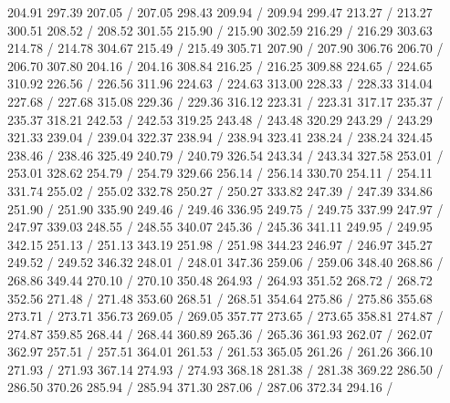{ 204.91 297.39 207.05 /
 207.05 298.43 209.94 /
 209.94 299.47 213.27 /
 213.27 300.51 208.52 /
 208.52 301.55 215.90 /
 215.90 302.59 216.29 /
 216.29 303.63 214.78 /
 214.78 304.67 215.49 /
 215.49 305.71 207.90 /
 207.90 306.76 206.70 /
 206.70 307.80 204.16 /
 204.16 308.84 216.25 /
 216.25 309.88 224.65 /
 224.65 310.92 226.56 /
 226.56 311.96 224.63 /
 224.63 313.00 228.33 /
 228.33 314.04 227.68 /
 227.68 315.08 229.36 /
 229.36 316.12 223.31 /
 223.31 317.17 235.37 /
 235.37 318.21 242.53 /
 242.53 319.25 243.48 /
 243.48 320.29 243.29 /
 243.29 321.33 239.04 /
 239.04 322.37 238.94 /
 238.94 323.41 238.24 /
 238.24 324.45 238.46 /
 238.46 325.49 240.79 /
 240.79 326.54 243.34 /
 243.34 327.58 253.01 /
 253.01 328.62 254.79 /
 254.79 329.66 256.14 /
 256.14 330.70 254.11 /
 254.11 331.74 255.02 /
 255.02 332.78 250.27 /
 250.27 333.82 247.39 /
 247.39 334.86 251.90 /
 251.90 335.90 249.46 /
 249.46 336.95 249.75 /
 249.75 337.99 247.97 /
 247.97 339.03 248.55 /
 248.55 340.07 245.36 /
 245.36 341.11 249.95 /
 249.95 342.15 251.13 /
 251.13 343.19 251.98 /
 251.98 344.23 246.97 /
 246.97 345.27 249.52 /
 249.52 346.32 248.01 /
 248.01 347.36 259.06 /
 259.06 348.40 268.86 /
 268.86 349.44 270.10 /
 270.10 350.48 264.93 /
 264.93 351.52 268.72 /
 268.72 352.56 271.48 /
 271.48 353.60 268.51 /
 268.51 354.64 275.86 /
 275.86 355.68 273.71 /
 273.71 356.73 269.05 /
 269.05 357.77 273.65 /
 273.65 358.81 274.87 /
 274.87 359.85 268.44 /
 268.44 360.89 265.36 /
 265.36 361.93 262.07 /
 262.07 362.97 257.51 /
 257.51 364.01 261.53 /
 261.53 365.05 261.26 /
 261.26 366.10 271.93 /
 271.93 367.14 274.93 /
 274.93 368.18 281.38 /
 281.38 369.22 286.50 /
 286.50 370.26 285.94 /
 285.94 371.30 287.06 /
 287.06 372.34 294.16 /
}
